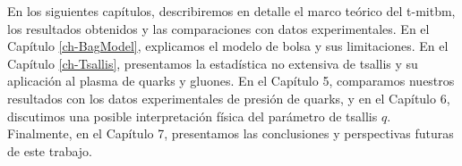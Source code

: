 En los siguientes capítulos, describiremos en detalle el marco teórico del \acrshort{t-mitbm}, los resultados obtenidos y las comparaciones con datos experimentales. En el Capítulo \ref{ch-BagModel}, explicamos el modelo de bolsa y sus limitaciones. En el Capítulo \ref{ch-Tsallis}, presentamos la estadística no extensiva de \Gls{tsallis} y su aplicación al plasma de quarks y gluones. En el Capítulo 5, comparamos nuestros resultados con los datos experimentales de presión de quarks, y en el Capítulo 6, discutimos una posible interpretación física del parámetro de \Gls{tsallis} $q$. Finalmente, en el Capítulo 7, presentamos las conclusiones y perspectivas futuras de este trabajo.

\newpage

\thispagestyle{empty}